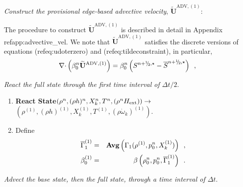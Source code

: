 \documentclass[11pt]{article}
\newcommand{\gammabar}{\overline{\Gamma}_1}
\newcommand{\nablab}{\mathbf{\nabla}}
\newcommand{\cdotb}{\mathbf{\cdot}}
\newcommand{\sfrac}[2]{\mathchoice
  {\kern0em\raise.5ex\hbox{\the\scriptfont0 #1}\kern-.15em/
   \kern-.15em\lower.25ex\hbox{\the\scriptfont0 #2}}
  {\kern0em\raise.5ex\hbox{\the\scriptfont0 #1}\kern-.15em/
   \kern-.15em\lower.25ex\hbox{\the\scriptfont0 #2}}
  {\kern0em\raise.5ex\hbox{\the\scriptscriptfont0 #1}\kern-.2em/
   \kern-.15em\lower.25ex\hbox{\the\scriptscriptfont0 #2}}
  {#1\!/#2}}
\newcommand{\myhalf}{\sfrac{1}{2}}
\newcommand{\nph}{{n + \myhalf}}
\newcommand{\Hext}{{H_{\rm ext}}}
\newcommand{\uadvone}{\widetilde{\mathbf{U}}^{\mathrm{ADV},(1)}}
\newcommand{\dt}{\Delta t}
\newcommand{\omegadot}{\dot{\omega}}
\begin{document}
 {\em Construct the provisional edge-based advective velocity}, $\uadvone$: 

The procedure to construct $\uadvone$ is described in detail in Appendix ref{app:advective\_vel}.
We note that  $\uadvone$ satisfies the discrete versions of equations
(ref{eq:udoterzero}) and (ref{eq:tildeconstraint}), 
in particular,
\begin{equation}
\nablab \cdotb \left(\beta_0^n \uadvone\right) = \beta_0^n \left(S^{\nph,\star} - \overline{S}^{\nph,\star}\right)
\enskip ,
\end{equation}

 {\em React the full state through the first time interval of $\dt / 2.$}

\begin{enumerate}
\renewcommand{\theenumi}{{\bf \alph{enumi}}}

\item {\bf React State}$(\rho^n, (\rho h)^n, X_k^n, T^n, (\rho^n \Hext))
                   \rightarrow$ $( \rho^{(1)}, (\rho h)^{(1)}, X_k^{(1)}, T^{(1)},
                                  (\rho \omegadot_k)^{(1)} ).$  

\item
Define
\begin{eqnarray}
\gammabar^{(1)}        &=& {\rm{\bf Avg}} \left( \Gamma_1(\rho^{(1)}, p_0^{n}, X_k^{(1)}) \right) 
                                                                \enskip , \nonumber \\
 {\beta   }_0^{(1)}    &=& \beta   \left(\rho_0^{n}, p_0^{n}, \gammabar^{(1)}\right) \enskip .
\end{eqnarray}

\end{enumerate}

 {\em Advect the base state, then the full state, through a time interval of $\dt.$}
\end{document}
